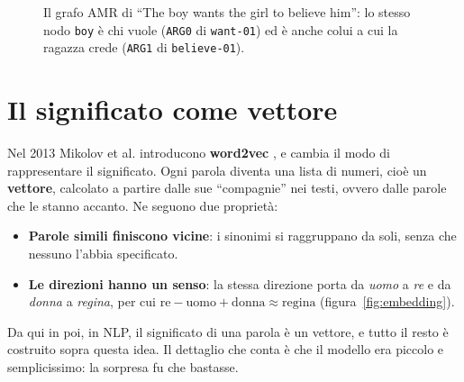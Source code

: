 \begin{figure}[htbp]
\centering
{}
\caption{Il grafo AMR di \enquote{The boy wants the girl to believe him}: lo stesso nodo \texttt{boy} è chi vuole (\texttt{ARG0} di \texttt{want-01}) ed è anche colui a cui la ragazza crede (\texttt{ARG1} di \texttt{believe-01}).}
\label{fig:amr}
\end{figure}

\section{Il significato come vettore}
Nel 2013 Mikolov et al. introducono \textbf{word2vec} \cite{mikolov2013word2vec}, e cambia il modo di rappresentare il significato. Ogni parola diventa una lista di numeri, cioè un \textbf{vettore}, calcolato a partire dalle sue \enquote{compagnie} nei testi, ovvero dalle parole che le stanno accanto. Ne seguono due proprietà:
\begin{itemize}
    \item \textbf{Parole simili finiscono vicine}: i sinonimi si raggruppano da soli, senza che nessuno l'abbia specificato.
    \item \textbf{Le direzioni hanno un senso}: la stessa direzione porta da \textit{uomo} a \textit{re} e da \textit{donna} a \textit{regina}, per cui $\text{re} - \text{uomo} + \text{donna} \approx \text{regina}$ (figura~\ref{fig:embedding}).
\end{itemize}
Da qui in poi, in NLP, il significato di una parola è un vettore, e tutto il resto è costruito sopra questa idea. Il dettaglio che conta è che il modello era piccolo e semplicissimo: la sorpresa fu che bastasse.

